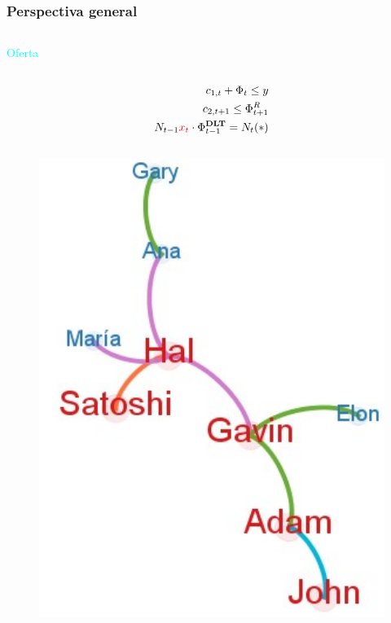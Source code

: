 \begin{frame}[plain]
\frametitle{Perspectiva general}
\begin{columns}


    \begin{column}{0.50\textwidth}
    \vspace{-5pt}
    \begin{block}{\textcolor{cyan}{Oferta}}
        \begin{column}{0.1\textwidth}
        \vspace{-10pt} %
            \tiny
            \begin{align*}
            c_{1,t}+\Phi_t \le y\\
            c_{2,t+1}\le\Phi_{t+1}^R\\
            N_{t-1}\textcolor{red}{x_t} \cdot \Phi_{t-1}^{\textbf{DLT}}=N_t(*)
            \end{align*}
        \end{column}
        \begin{column}{0.35\textwidth}  
            \begin{figure}[H]
            \begin{center}
             \includegraphics[width=1\textwidth]{images/C2/c2_simul_red5.jpg}
             \end{center}
            \end{figure}
            \end{column}
    \end{block}
    

\end{column}
\end{columns}
\end{frame}
